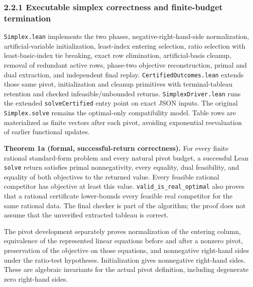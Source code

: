 \documentclass[
  10pt,
]{article}
\begin{document}
\subsubsection{2.2.1 Executable simplex correctness and finite-budget termination}\label{executable-simplex-correctness-and-finite-budget-termination}

\texttt{Simplex.lean} implements the two phases, negative-right-hand-side normalization, artificial-variable initialization, least-index entering selection, ratio selection with least-basic-index tie breaking, exact row elimination, artificial-basis cleanup, removal of redundant active rows, phase-two objective reconstruction, primal and dual extraction, and independent final replay. \texttt{CertifiedOutcomes.lean} extends those same pivot, initialization and cleanup primitives with terminal-tableau retention and checked infeasible/unbounded returns. \texttt{SimplexDriver.lean} runs the extended \texttt{solveCertified} entry point on exact JSON inputs. The original \texttt{Simplex.solve} remains the optimal-only compatibility model. Table rows are materialized as finite vectors after each pivot, avoiding exponential reevaluation of earlier functional updates.

\textbf{Theorem 1a (formal, successful-return correctness).} For every finite rational standard-form problem and every natural pivot budget, a successful Lean \texttt{solve} return satisfies primal nonnegativity, every equality, dual feasibility, and equality of both objectives to the returned value. Every feasible rational competitor has objective at least this value. \texttt{valid\_is\_real\_optimal} also proves that a rational certificate lower-bounds every feasible real competitor for the same rational data. The final checker is part of the algorithm; the proof does not assume that the unverified extracted tableau is correct.

The pivot development separately proves normalization of the entering column, equivalence of the represented linear equations before and after a nonzero pivot, preservation of the objective on those equations, and nonnegative right-hand sides under the ratio-test hypotheses. Initialization gives nonnegative right-hand sides. These are algebraic invariants for the actual pivot definition, including degenerate zero right-hand sides.
\end{document}
